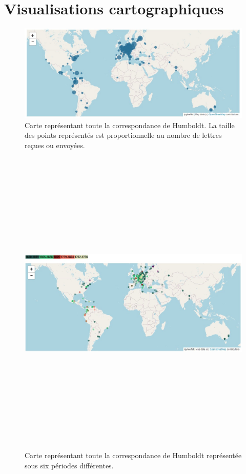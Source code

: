 \documentclass[a4paper, 12pt, twoside]{book}
\begin{document}
\chapter{Visualisations cartographiques}
\begin{changemargin}{-1cm}{-1cm}
\begin{figure}[h!]
\centering
\includegraphics[scale=0.6]{img/mapviz_toutes.jpg}
\caption{Carte représentant toute la correspondance de Humboldt. La taille des points représentés est proportionnelle au nombre de lettres reçues ou envoyées.}
\label{fig:allLettersMap}
\end{figure}
\end{changemargin}

\begin{figure}[h!]
\centering
\includegraphics[angle=90,origin=c, height=15cm]{img/mapviz_color_legende.jpg}
\caption{Carte représentant toute la correspondance de Humboldt représentée sous six périodes différentes.}
\label{fig:allLettersMapColors}
\end{figure}
\end{document}

